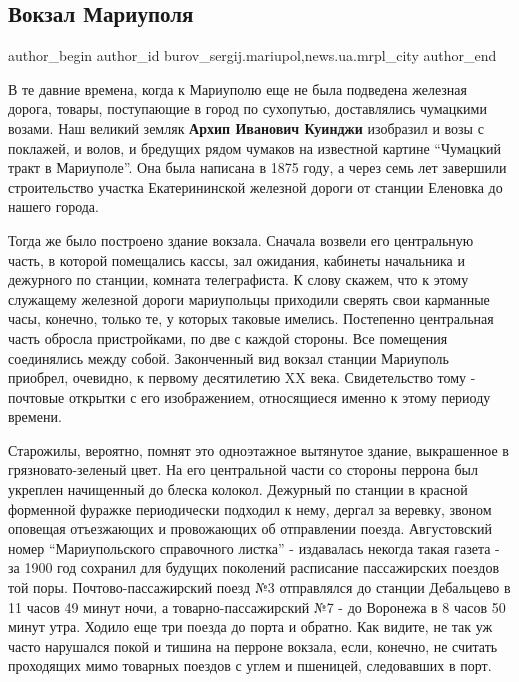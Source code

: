  
 
 
 
 
 
\subsection{Вокзал Мариуполя}
\label{sec:02_06_2018.stz.news.ua.mrpl_city.1.vokzal_mariupolja}
 
\ifcmt
 author_begin
   author_id burov_sergij.mariupol,news.ua.mrpl_city
 author_end
\fi

В те давние времена, когда к Мариуполю еще не была подведена железная дорога,
товары, поступающие в город по сухопутью, доставлялись чумацкими возами. Наш
великий земляк \textbf{Архип Иванович Куинджи} изобразил и возы с поклажей, и волов, и
бредущих рядом чумаков на известной картине \enquote{Чумацкий тракт в Мариуполе}. Она
была написана в 1875 году, а через семь лет завершили строительство участка
Екатерининской железной дороги от станции Еленовка до нашего города.


Тогда же было построено здание вокзала. Сначала возвели его центральную часть,
в которой помещались кассы, зал ожидания, кабинеты начальника и дежурного по
станции, комната телеграфиста. К слову скажем, что к этому служащему железной
дороги мариупольцы приходили сверять свои карманные часы, конечно, только те, у
которых таковые имелись. Постепенно центральная часть обросла пристройками, по
две с каждой стороны. Все помещения соединялись между собой. Законченный вид
вокзал станции Мариуполь приобрел, очевидно, к первому десятилетию XX века.
Свидетельство тому - почтовые открытки с его изображением, относящиеся именно к
этому периоду времени.

Старожилы, вероятно, помнят это одноэтажное вытянутое здание, выкрашенное в
грязновато-зеленый цвет. На его центральной части со стороны перрона был
укреплен начищенный до блеска колокол. Дежурный по станции в красной форменной
фуражке периодически подходил к нему, дергал за веревку, звоном оповещая
отъезжающих и провожающих об отправлении поезда. Августовский номер
\enquote{Мариупольского справочного листка} - издавалась некогда такая газета - за 1900
год сохранил для будущих поколений расписание пассажирских поездов той поры.
Почтово-пассажирский поезд №3 отправлялся до станции Дебальцево в 11 часов 49
минут ночи, а товарно-пассажирский №7 - до Воронежа в 8 часов 50 минут утра.
Ходило еще три поезда до порта и обратно. Как видите, не так уж часто нарушался
покой и тишина на перроне вокзала, если, конечно, не считать проходящих мимо
товарных поездов с углем и пшеницей, следовавших в порт.

